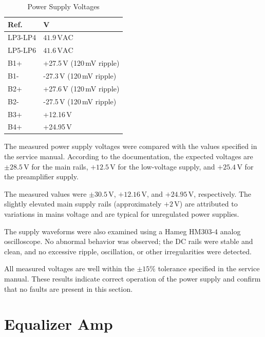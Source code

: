 \documentclass[]{article}
\begin{document}
\begin{table}[H]
	\centering
	\caption{Power Supply Voltages}
	\label{tab:power_supply_volt}
	\begin{tabular}{|l|l|}
		\hline
		\textbf{Ref.} & \textbf{V} \\
        \hline
        LP3-LP4 & $41.9\,\mathrm{VAC}$ \\
        \hline
        LP5-LP6 & $41.6\,\mathrm{VAC}$ \\
        \hline
        B1+ & +27.5\,V (120\,mV ripple) \\
        \hline
        B1- & -27.3\,V (120\,mV ripple) \\
        \hline
        B2+ & +27.6\,V (120\,mV ripple) \\
        \hline
        B2- & -27.5\,V (120\,mV ripple) \\
        \hline
        B3+ & +12.16\,V \\
        \hline
        B4+ & +24.95\,V \\
        \hline
	\end{tabular}
\end{table}

The measured power supply voltages were compared with the values specified in the service manual. According to the documentation, the expected voltages are $\pm 28.5\,\mathrm{V}$ for the main rails, $+12.5\,\mathrm{V}$ for the low-voltage supply, and $+25.4\,\mathrm{V}$ for the preamplifier supply.

The measured values were $\pm 30.5\,\mathrm{V}$, $+12.16\,\mathrm{V}$, and $+24.95\,\mathrm{V}$, respectively. The slightly elevated main supply rails (approximately $+2\,\mathrm{V}$) are attributed to variations in mains voltage and are typical for unregulated power supplies.

The supply waveforms were also examined using a Hameg HM303-4 analog oscilloscope. No abnormal behavior was observed; the DC rails were stable and clean, and no excessive ripple, oscillation, or other irregularities were detected.

All measured voltages are well within the $\pm 15\%$ tolerance specified in the service manual. These results indicate correct operation of the power supply and confirm that no faults are present in this section.

\section{Equalizer Amp}
\end{document}
